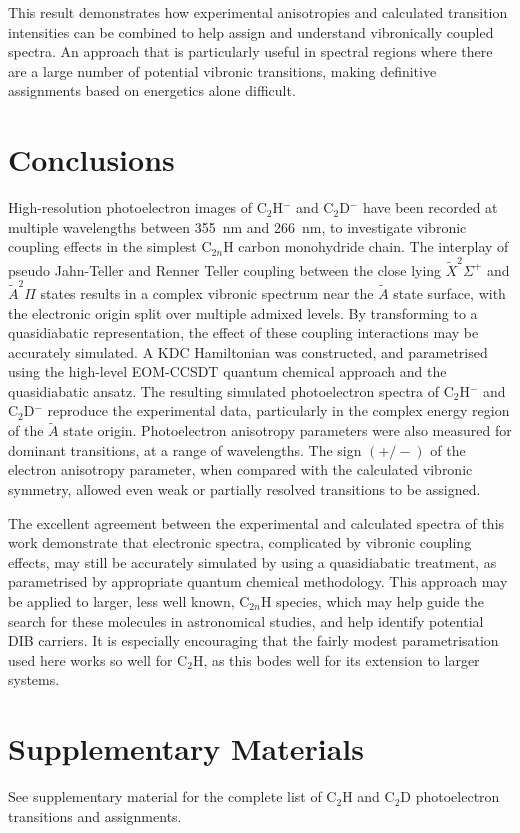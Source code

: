 \documentclass[aip,graphicx]{revtex4-1}
\begin{document}
This result demonstrates how experimental anisotropies and calculated transition intensities can be combined to help assign and understand vibronically coupled spectra. An approach that is particularly useful in spectral regions where there are a large number of potential vibronic transitions, making definitive assignments based on energetics alone difficult.



\section{Conclusions} 
High-resolution photoelectron images of C$_2$H$^-$ and C$_2$D$^-$ have been recorded at multiple wavelengths between 355~nm and 266~nm, to investigate vibronic coupling effects in the simplest C$_{2n}$H carbon monohydride chain. The interplay of pseudo Jahn-Teller and Renner Teller coupling between the close lying $\tilde{X}^2\Sigma^+$ and $\tilde{A}^2\Pi$ states results in a complex vibronic spectrum near the $\tilde{A}$ state surface, with the electronic origin split over multiple admixed levels. By transforming to a quasidiabatic representation, the effect of these coupling interactions may be accurately simulated. A KDC Hamiltonian was constructed, and parametrised using the high-level EOM-CCSDT quantum chemical approach and the quasidiabatic ansatz. The resulting simulated photoelectron spectra of C$_2$H$^-$ and C$_2$D$^-$ reproduce the experimental data, particularly in the complex energy region of the $\tilde{A}$ state origin. Photoelectron anisotropy parameters were also measured for dominant transitions, at a range of wavelengths. The sign $(+/-)$ of the electron anisotropy parameter, when compared with the calculated vibronic symmetry, allowed even weak or partially resolved transitions to be assigned.

The excellent agreement between the experimental and calculated spectra of this work
demonstrate that electronic spectra, complicated by vibronic coupling effects, may still be accurately simulated by using a quasidiabatic treatment, as parametrised by appropriate quantum chemical methodology. This approach may be applied to larger, less well known, C$_{2n}$H species, which may help guide the search for these molecules in astronomical studies, and help identify potential DIB carriers. It is especially encouraging that the fairly modest parametrisation used here works so well for C$_2$H, as this bodes well for its extension to larger systems.


\section*{Supplementary Materials}
See supplementary material for the complete list of C$_2$H and C$_2$D photoelectron transitions and assignments.
\end{document}
